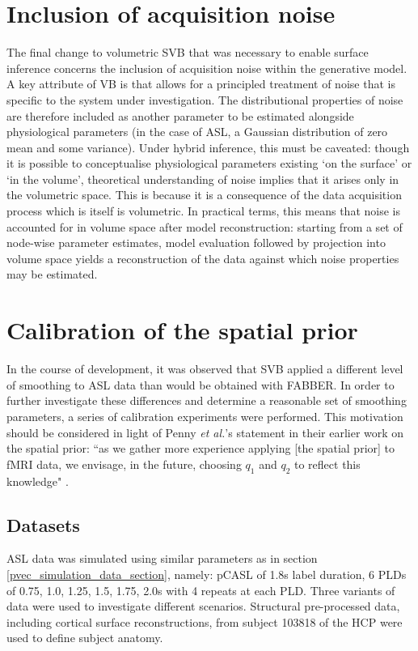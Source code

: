 \section{Inclusion of acquisition noise}

The final change to volumetric SVB that was necessary to enable surface inference concerns the inclusion of acquisition noise within the generative model. A key attribute of VB is that allows for a principled treatment of noise that is specific to the system under investigation. The distributional properties of noise are therefore included as another parameter to be estimated alongside physiological parameters (in the case of ASL, a Gaussian distribution of zero mean and some variance). Under hybrid inference, this must be caveated: though it is possible to conceptualise physiological parameters existing `on the surface' or `in the volume', theoretical understanding of noise implies that it arises only in the volumetric space. This is because it is a consequence of the data acquisition process which is itself is volumetric. In practical terms, this means that noise is accounted for in volume space after model reconstruction: starting from a set of node-wise parameter estimates, model evaluation followed by projection into volume space yields a reconstruction of the data against which noise properties may be estimated. 

\section{Calibration of the spatial prior}
\label{prior_calibration}

In the course of development, it was observed that SVB applied a different level of smoothing to ASL data than would be obtained with FABBER. In order to further investigate these differences and determine a reasonable set of smoothing parameters, a series of calibration experiments were performed. This motivation should be considered in light of Penny \textit{et al.}'s statement in their earlier work on the spatial prior: ``as we gather more experience applying [the spatial prior] to fMRI data, we envisage, in the future, choosing $q_1$ and $q_2$ to reflect this knowledge" \cite{Penny2005}. 

\subsection{Datasets}

ASL data was simulated using similar parameters as in section \ref{pvec_simulation_data_section}, namely: pCASL of 1.8s label duration, 6 PLDs of 0.75, 1.0, 1.25, 1.5, 1.75, 2.0s with 4 repeats at each PLD. Three variants of data were used to investigate different scenarios. Structural pre-processed data, including cortical surface reconstructions, from subject 103818 of the HCP were used to define subject anatomy. 

